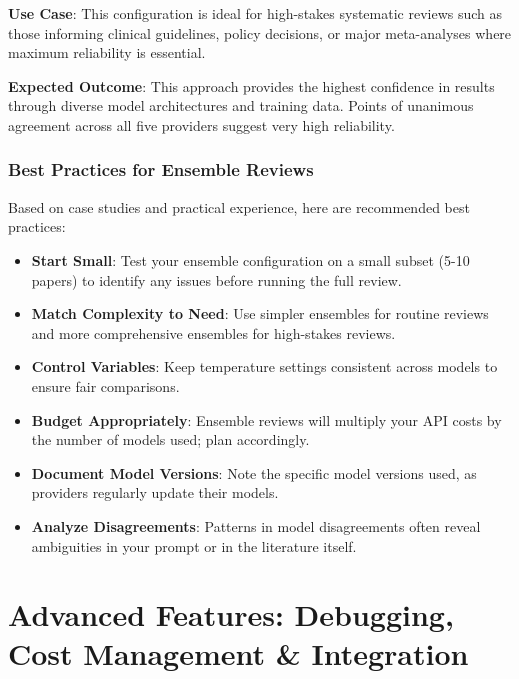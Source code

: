 \textbf{Use Case}: This configuration is ideal for high-stakes systematic reviews such as those informing clinical guidelines, policy decisions, or major meta-analyses where maximum reliability is essential.

\textbf{Expected Outcome}: This approach provides the highest confidence in results through diverse model architectures and training data. Points of unanimous agreement across all five providers suggest very high reliability.


\subsection{Best Practices for Ensemble Reviews}

Based on case studies and practical experience, here are recommended best practices:

\begin{itemize}
    \item \textbf{Start Small}: Test your ensemble configuration on a small subset (5-10 papers) to identify any issues before running the full review.
    \item \textbf{Match Complexity to Need}: Use simpler ensembles for routine reviews and more comprehensive ensembles for high-stakes reviews.
    \item \textbf{Control Variables}: Keep temperature settings consistent across models to ensure fair comparisons.
    \item \textbf{Budget Appropriately}: Ensemble reviews will multiply your API costs by the number of models used; plan accordingly.
    \item \textbf{Document Model Versions}: Note the specific model versions used, as providers regularly update their models.
    \item \textbf{Analyze Disagreements}: Patterns in model disagreements often reveal ambiguities in your prompt or in the literature itself.
\end{itemize}


\chapter{Advanced Features: Debugging, Cost Management \& Integration} \label{chap:advanced_features}

